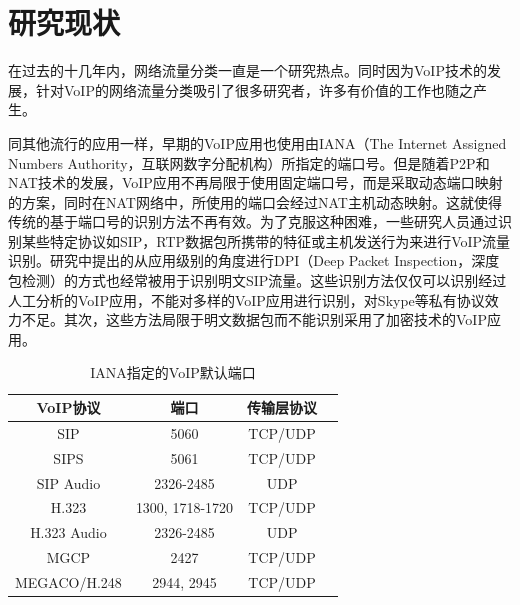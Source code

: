 
\section{研究现状}
在过去的十几年内，网络流量分类一直是一个研究热点。同时因为VoIP技术的发展，针对VoIP的网络流量分类吸引了很多研究者，许多有价值的工作也随之产生。

同其他流行的应用一样，早期的VoIP应用也使用由IANA（The Internet Assigned Numbers Authority，互联网数字分配机构）所指定的端口号。但是随着P2P和NAT技术的发展，VoIP应用不再局限于使用固定端口号，而是采取动态端口映射的方案，同时在NAT网络中，所使用的端口会经过NAT主机动态映射。这就使得传统的基于端口号的识别方法不再有效。为了克服这种困难，一些研究人员\supercite{14, 16, 13}通过识别某些特定协议如SIP，RTP数据包所携带的特征或主机发送行为来进行VoIP流量识别。研究\supercite{18}中提出的从应用级别的角度进行DPI（Deep Packet Inspection，深度包检测）的方式也经常被用于识别明文SIP流量。这些识别方法仅仅可以识别经过人工分析的VoIP应用，不能对多样的VoIP应用进行识别，对Skype等私有协议效力不足。其次，这些方法局限于明文数据包而不能识别采用了加密技术的VoIP应用。

\begin{table} [thb]
\caption{IANA指定的VoIP默认端口}\label{tab:21}
\small
\centering
{
\begin{tabular}{cccc}
  \toprule
        VoIP协议 & 端口 & 传输层协议 \\
  \midrule
        SIP & 5060 & TCP/UDP \\
        SIPS & 5061 & TCP/UDP \\
        SIP Audio & 2326-2485 & UDP\\
        H.323 & 1300, 1718-1720 & TCP/UDP\\
        H.323 Audio & 2326-2485 & UDP\\
        MGCP & 2427 & TCP/UDP\\
        MEGACO/H.248 & 2944, 2945 & TCP/UDP\\
 \bottomrule
\end{tabular}
}
\end{table}

